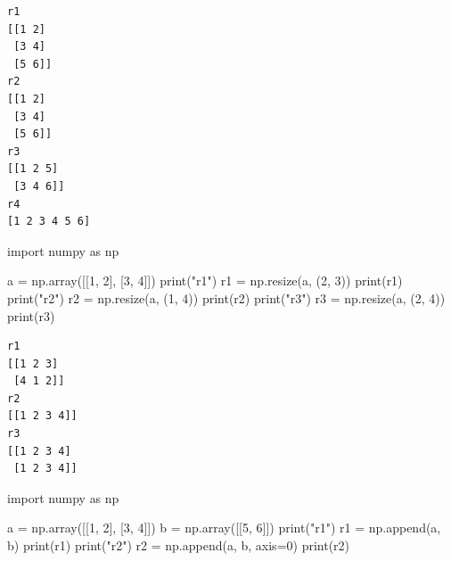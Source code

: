 \documentclass[
  english,
  letterpaper,
  DIV=11,
  numbers=noendperiod]{scrreprt}
\newenvironment{Shaded}{\begin{snugshade}}{\end{snugshade}}
\newcommand{\BuiltInTok}[1]{\textcolor[rgb]{0.00,0.23,0.31}{#1}}
\newcommand{\DecValTok}[1]{\textcolor[rgb]{0.68,0.00,0.00}{#1}}
\newcommand{\ImportTok}[1]{\textcolor[rgb]{0.00,0.46,0.62}{#1}}
\newcommand{\NormalTok}[1]{\textcolor[rgb]{0.00,0.23,0.31}{#1}}
\newcommand{\OperatorTok}[1]{\textcolor[rgb]{0.37,0.37,0.37}{#1}}
\newcommand{\StringTok}[1]{\textcolor[rgb]{0.13,0.47,0.30}{#1}}
\begin{document}
\begin{verbatim}
r1
[[1 2]
 [3 4]
 [5 6]]
r2
[[1 2]
 [3 4]
 [5 6]]
r3
[[1 2 5]
 [3 4 6]]
r4
[1 2 3 4 5 6]
\end{verbatim}

\begin{Shaded}
\begin{Highlighting}[]
\ImportTok{import}\NormalTok{ numpy }\ImportTok{as}\NormalTok{ np}

\NormalTok{a }\OperatorTok{=}\NormalTok{ np.array([[}\DecValTok{1}\NormalTok{, }\DecValTok{2}\NormalTok{], [}\DecValTok{3}\NormalTok{, }\DecValTok{4}\NormalTok{]])}
\BuiltInTok{print}\NormalTok{(}\StringTok{"r1"}\NormalTok{)}
\NormalTok{r1 }\OperatorTok{=}\NormalTok{ np.resize(a, (}\DecValTok{2}\NormalTok{, }\DecValTok{3}\NormalTok{))}
\BuiltInTok{print}\NormalTok{(r1)}
\BuiltInTok{print}\NormalTok{(}\StringTok{"r2"}\NormalTok{)}
\NormalTok{r2 }\OperatorTok{=}\NormalTok{ np.resize(a, (}\DecValTok{1}\NormalTok{, }\DecValTok{4}\NormalTok{))}
\BuiltInTok{print}\NormalTok{(r2)}
\BuiltInTok{print}\NormalTok{(}\StringTok{"r3"}\NormalTok{)}
\NormalTok{r3 }\OperatorTok{=}\NormalTok{ np.resize(a, (}\DecValTok{2}\NormalTok{, }\DecValTok{4}\NormalTok{))}
\BuiltInTok{print}\NormalTok{(r3)}
\end{Highlighting}
\end{Shaded}

\begin{verbatim}
r1
[[1 2 3]
 [4 1 2]]
r2
[[1 2 3 4]]
r3
[[1 2 3 4]
 [1 2 3 4]]
\end{verbatim}

\begin{Shaded}
\begin{Highlighting}[]
\ImportTok{import}\NormalTok{ numpy }\ImportTok{as}\NormalTok{ np}

\NormalTok{a }\OperatorTok{=}\NormalTok{ np.array([[}\DecValTok{1}\NormalTok{, }\DecValTok{2}\NormalTok{], [}\DecValTok{3}\NormalTok{, }\DecValTok{4}\NormalTok{]])}
\NormalTok{b }\OperatorTok{=}\NormalTok{ np.array([[}\DecValTok{5}\NormalTok{, }\DecValTok{6}\NormalTok{]])}
\BuiltInTok{print}\NormalTok{(}\StringTok{"r1"}\NormalTok{)}
\NormalTok{r1 }\OperatorTok{=}\NormalTok{ np.append(a, b)}
\BuiltInTok{print}\NormalTok{(r1)}
\BuiltInTok{print}\NormalTok{(}\StringTok{"r2"}\NormalTok{)}
\NormalTok{r2 }\OperatorTok{=}\NormalTok{ np.append(a, b, axis}\OperatorTok{=}\DecValTok{0}\NormalTok{)}
\BuiltInTok{print}\NormalTok{(r2)}
\end{Highlighting}
\end{Shaded}
\end{document}
